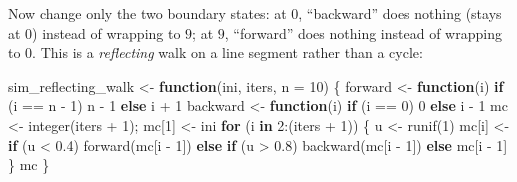 \documentclass[
  letterpaper,
  DIV=11,
  numbers=noendperiod]{scrreprt}
\newenvironment{Shaded}{\begin{snugshade}}{\end{snugshade}}
\newcommand{\AttributeTok}[1]{\textcolor[rgb]{0.40,0.45,0.13}{#1}}
\newcommand{\ControlFlowTok}[1]{\textcolor[rgb]{0.00,0.23,0.31}{\textbf{#1}}}
\newcommand{\DecValTok}[1]{\textcolor[rgb]{0.68,0.00,0.00}{#1}}
\newcommand{\FloatTok}[1]{\textcolor[rgb]{0.68,0.00,0.00}{#1}}
\newcommand{\FunctionTok}[1]{\textcolor[rgb]{0.28,0.35,0.67}{#1}}
\newcommand{\NormalTok}[1]{\textcolor[rgb]{0.00,0.23,0.31}{#1}}
\newcommand{\OtherTok}[1]{\textcolor[rgb]{0.00,0.23,0.31}{#1}}
\newcommand{\SpecialCharTok}[1]{\textcolor[rgb]{0.37,0.37,0.37}{#1}}
\begin{document}
Now change only the two boundary states: at \(0\), ``backward'' does
nothing (stays at \(0\)) instead of wrapping to \(9\); at \(9\),
``forward'' does nothing instead of wrapping to \(0\). This is a
\emph{reflecting} walk on a line segment rather than a cycle:

\begin{Shaded}
\begin{Highlighting}[]
\NormalTok{sim\_reflecting\_walk }\OtherTok{\textless{}{-}} \ControlFlowTok{function}\NormalTok{(ini, iters, }\AttributeTok{n =} \DecValTok{10}\NormalTok{) \{}
\NormalTok{    forward  }\OtherTok{\textless{}{-}} \ControlFlowTok{function}\NormalTok{(i) }\ControlFlowTok{if}\NormalTok{ (i }\SpecialCharTok{==}\NormalTok{ n }\SpecialCharTok{{-}} \DecValTok{1}\NormalTok{) n }\SpecialCharTok{{-}} \DecValTok{1} \ControlFlowTok{else}\NormalTok{ i }\SpecialCharTok{+} \DecValTok{1}
\NormalTok{    backward }\OtherTok{\textless{}{-}} \ControlFlowTok{function}\NormalTok{(i) }\ControlFlowTok{if}\NormalTok{ (i }\SpecialCharTok{==} \DecValTok{0}\NormalTok{) }\DecValTok{0} \ControlFlowTok{else}\NormalTok{ i }\SpecialCharTok{{-}} \DecValTok{1}
\NormalTok{    mc }\OtherTok{\textless{}{-}} \FunctionTok{integer}\NormalTok{(iters }\SpecialCharTok{+} \DecValTok{1}\NormalTok{); mc[}\DecValTok{1}\NormalTok{] }\OtherTok{\textless{}{-}}\NormalTok{ ini}
    \ControlFlowTok{for}\NormalTok{ (i }\ControlFlowTok{in} \DecValTok{2}\SpecialCharTok{:}\NormalTok{(iters }\SpecialCharTok{+} \DecValTok{1}\NormalTok{)) \{}
\NormalTok{        u }\OtherTok{\textless{}{-}} \FunctionTok{runif}\NormalTok{(}\DecValTok{1}\NormalTok{)}
\NormalTok{        mc[i] }\OtherTok{\textless{}{-}} \ControlFlowTok{if}\NormalTok{ (u }\SpecialCharTok{\textless{}} \FloatTok{0.4}\NormalTok{) }\FunctionTok{forward}\NormalTok{(mc[i }\SpecialCharTok{{-}} \DecValTok{1}\NormalTok{])}
                 \ControlFlowTok{else} \ControlFlowTok{if}\NormalTok{ (u }\SpecialCharTok{\textgreater{}} \FloatTok{0.8}\NormalTok{) }\FunctionTok{backward}\NormalTok{(mc[i }\SpecialCharTok{{-}} \DecValTok{1}\NormalTok{])}
                 \ControlFlowTok{else}\NormalTok{ mc[i }\SpecialCharTok{{-}} \DecValTok{1}\NormalTok{]}
\NormalTok{    \}}
\NormalTok{    mc}
\NormalTok{\}}
\end{Highlighting}
\end{Shaded}
\end{document}
